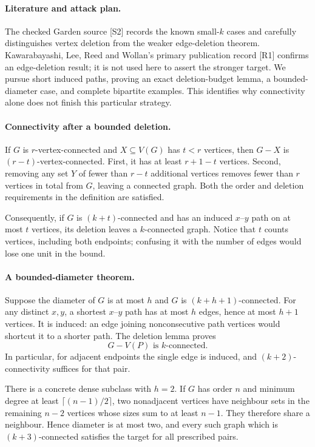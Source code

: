 \documentclass[11pt,a4paper]{article}
\begin{document}
\paragraph{Literature and attack plan.}
The checked Garden source [S2] records the known small-$k$ cases and carefully distinguishes vertex deletion from the weaker edge-deletion theorem. Kawarabayashi, Lee, Reed and Wollan's primary publication record [R1] confirms an edge-deletion result; it is not used here to assert the stronger target. We pursue short induced paths, proving an exact deletion-budget lemma, a bounded-diameter case, and complete bipartite examples. This identifies why connectivity alone does not finish this particular strategy.

\paragraph{Connectivity after a bounded deletion.}
If $G$ is $r$-vertex-connected and $X\subseteq V(G)$ has $t<r$ vertices, then $G-X$ is $(r-t)$-vertex-connected. First, it has at least $r+1-t$ vertices. Second, removing any set $Y$ of fewer than $r-t$ additional vertices removes fewer than $r$ vertices in total from $G$, leaving a connected graph. Both the order and deletion requirements in the definition are satisfied.

Consequently, if $G$ is $(k+t)$-connected and has an induced $x$--$y$ path on at most $t$ vertices, its deletion leaves a $k$-connected graph. Notice that $t$ counts vertices, including both endpoints; confusing it with the number of edges would lose one unit in the bound.

\paragraph{A bounded-diameter theorem.}
Suppose the diameter of $G$ is at most $h$ and $G$ is $(k+h+1)$-connected. For any distinct $x,y$, a shortest $x$--$y$ path has at most $h$ edges, hence at most $h+1$ vertices. It is induced: an edge joining nonconsecutive path vertices would shortcut it to a shorter path. The deletion lemma proves
\[
 G-V(P)\text{ is }k\text{-connected}. \tag{1}
\]
In particular, for adjacent endpoints the single edge is induced, and $(k+2)$-connectivity suffices for that pair.

There is a concrete dense subclass with $h=2$. If $G$ has order $n$ and minimum degree at least $\lceil(n-1)/2\rceil$, two nonadjacent vertices have neighbour sets in the remaining $n-2$ vertices whose sizes sum to at least $n-1$. They therefore share a neighbour. Hence diameter is at most two, and every such graph which is $(k+3)$-connected satisfies the target for all prescribed pairs.
\end{document}
